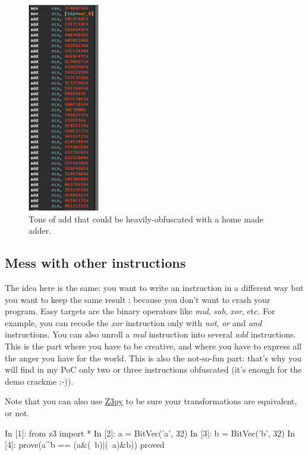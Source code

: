 \documentclass[a4paper, 11pt, notitlepage]{report}
\begin{document}
\begin{figure}[H]
  \centering
  \includegraphics[scale=0.7]{pics/adds.png}
  \caption{Tons of add that could be heavily-obfuscated with a home made adder.}
  \label{adds}
\end{figure}

\subsection{Mess with other instructions}
The idea here is the same: you want to write an instruction in a different way but you want to keep the same result ; because you don't want to crash your program. Easy targets are the binary operators like \textit{mul}, \textit{sub}, \textit{xor}, etc. For example, you can recode the \textit{xor} instruction only with \textit{not}, \textit{or} and \textit{and} instructions. You can also unroll a \textit{mul} instruction into several \textit{add} instructions. This is the part where you have to be creative, and where you have to express all the anger you have for the world. This is also the not-so-fun part: that's why you will find in my PoC only two or three instructions obfuscated (it's enough for the demo crackme :-)).

Note that you can also use \href{http://rise4fun.com/z3py}{Z3py} to be sure your transformations are equivalent, or not.
\begin{consolecode}
In [1]: from z3 import *
In [2]: a = BitVec('a', 32)
In [3]: b = BitVec('b', 32)
In [4]: prove(a^b == (a&(~b)|(~a)&b))
proved
\end{consolecode}
\end{document}
